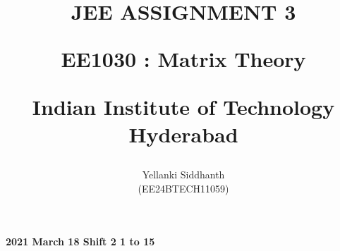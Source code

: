 \documentclass[journal]{IEEEtran}
\begin{document}

\onecolumn
\title{
JEE ASSIGNMENT 3

\large{EE1030 : Matrix Theory}

Indian Institute of Technology Hyderabad
}
\author{Yellanki Siddhanth

(EE24BTECH11059)
}	




\maketitle





\bigskip

\renewcommand{\thefigure}{\theenumi}
\renewcommand{\thetable}{\theenumi}
 
    
        \textbf{2021 March 18 Shift 2 1 to 15}
    
\end{document}
